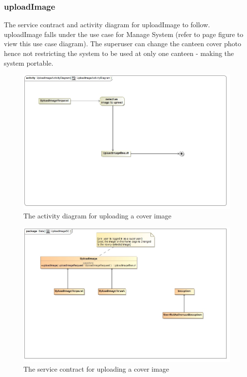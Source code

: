 \documentclass[a4paper,12pt]{report}
\begin{document}
\subsubsection{uploadImage}
The service contract and activity diagram for uploadImage to follow. uploadImage falls under the use case for Manage System (refer to page   figure   to view this use case diagram). The superuser can change the canteen cover photo hence not restricting the system to be used at only one canteen - making the system portable. 
\begin{figure}[H]
  \centering
    \includegraphics[width=1.0\textwidth]{../images/UploadImageActivityDiagram.jpg}
    \caption{The activity diagram for uploading a cover image} 
\end{figure}

\begin{figure}[H]
	\centering
	\includegraphics[width=1.0\textwidth]{../images/UploadImageSC.jpg}
	\caption{The service contract for uploading a cover image}
\end{figure}
\end{document}
